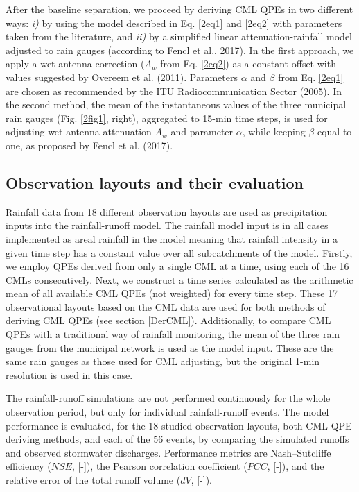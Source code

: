 \documentclass{ctuthesis}\usepackage[]{graphicx}\usepackage[]{color}
\begin{document}
After the baseline separation, we proceed by deriving CML QPEs in two different ways: \emph{i)} by using the model described in Eq. \ref{2eq1} and \ref{2eq2} with parameters taken from the literature, and \emph{ii)} by a simplified linear attenuation-rainfall model adjusted to rain gauges (according to Fencl et al., 2017). In the first approach, we apply a wet antenna correction ($A_w$ from Eq. \ref{2eq2}) as a constant offset with values suggested by Overeem et al. (2011). Parameters $\alpha$ and $\beta$ from Eq. \ref{2eq1} are chosen as recommended by the ITU Radiocommunication Sector (2005). In the second method, the mean of the instantaneous values of the three municipal rain gauges (Fig. \ref{2fig1}, right), aggregated to 15-min time steps, is used for adjusting wet antenna attenuation $A_w$ and parameter $\alpha$, while keeping $\beta$ equal to one, as proposed by Fencl et al. (2017).



\subsection{Observation layouts and their evaluation} \label{ObsLay}

Rainfall data from 18 different observation layouts are used as precipitation inputs into the rainfall-runoff model. The rainfall model input is in all cases implemented as areal rainfall in the model meaning that rainfall intensity in a given time step has a constant value over all subcatchments of the model. Firstly, we employ QPEs derived from only a single CML at a time, using each of the 16 CMLs consecutively. Next, we construct a time series calculated as the arithmetic mean of all available CML QPEs (not weighted) for every time step. These 17 observational layouts based on the CML data are used for both methods of deriving CML QPEs (see section \ref{DerCML}). Additionally, to compare CML QPEs with a traditional way of rainfall monitoring, the mean of the three rain gauges from the municipal network is used as the model input. These are the same rain gauges as those used for CML adjusting, but the original 1-min resolution is used in this case. 

The rainfall-runoff simulations are not performed continuously for the whole observation period, but only for individual rainfall-runoff events. The model performance is evaluated, for the 18 studied observation layouts, both CML QPE deriving methods, and each of the 56 events, by comparing the simulated runoffs and observed stormwater discharges. Performance metrics are Nash–Sutcliffe efficiency ($NSE$, [-]), the Pearson correlation coefficient ($PCC$, [-]), and the relative error of the total runoff volume ($dV$, [-]).
\end{document}

